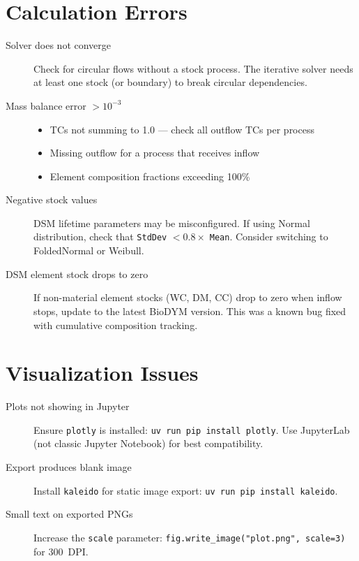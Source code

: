 \section{Calculation Errors}

\begin{description}
  \item[Solver does not converge] Check for circular flows without a stock process. The iterative solver needs at least one stock (or boundary) to break circular dependencies.

  \item[Mass balance error $>10^{-3}$] \hfill
  \begin{itemize}
    \item TCs not summing to 1.0 --- check all outflow TCs per process
    \item Missing outflow for a process that receives inflow
    \item Element composition fractions exceeding 100\%
  \end{itemize}

  \item[Negative stock values] DSM lifetime parameters may be misconfigured. If using Normal distribution, check that \texttt{StdDev} $< 0.8 \times$ \texttt{Mean}. Consider switching to FoldedNormal or Weibull.

  \item[DSM element stock drops to zero] If non-material element stocks (WC, DM, CC) drop to zero when inflow stops, update to the latest BioDYM version. This was a known bug fixed with cumulative composition tracking.
\end{description}

\section{Visualization Issues}

\begin{description}
  \item[Plots not showing in Jupyter] Ensure \texttt{plotly} is installed: \texttt{uv run pip install plotly}. Use JupyterLab (not classic Jupyter Notebook) for best compatibility.

  \item[Export produces blank image] Install \texttt{kaleido} for static image export: \texttt{uv run pip install kaleido}.

  \item[Small text on exported PNGs] Increase the \texttt{scale} parameter: \texttt{fig.write\_image("plot.png", scale=3)} for 300~DPI.
\end{description}

